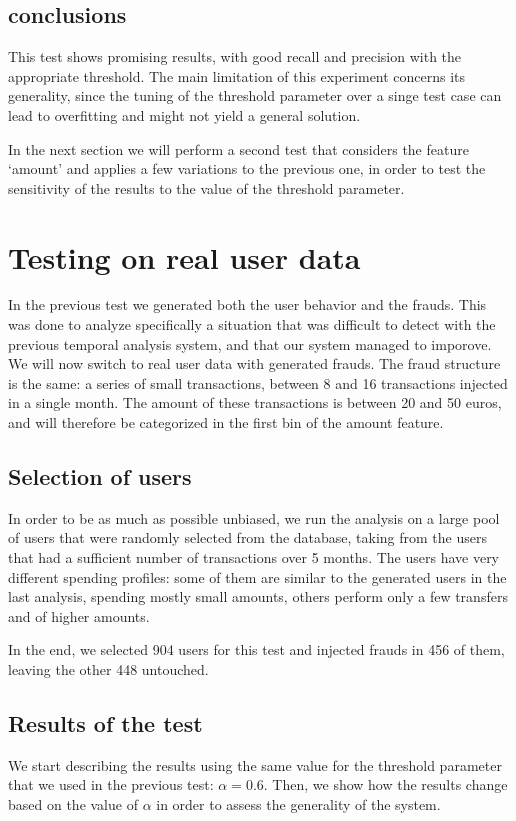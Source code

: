 \subsection{conclusions}

This test shows promising results, with good recall and precision with the appropriate threshold. The main limitation of this experiment concerns its generality, since the tuning of the threshold parameter over a singe test case can lead to overfitting and might not yield a general solution.

In the next section we will perform a second test that considers the feature `amount' and applies a few variations to the previous one, in order to test the sensitivity of the results to the value of the threshold parameter.

\section{Testing on real user data}

In the previous test we generated both the user behavior and the frauds. This was done to analyze specifically a situation that was difficult to detect with the previous temporal analysis system, and that our system managed to imporove. We will now switch to real user data with generated frauds. The fraud structure is the same: a series of small transactions, between 8 and 16 transactions injected in a single month. The amount of these transactions is between 20 and 50 euros, and will therefore be categorized in the first bin of the amount feature.

\subsection{Selection of users}
In order to be as much as possible unbiased, we run the analysis on a large pool of users that were randomly selected from the database, taking from the users that had a sufficient number of transactions over 5 months. The users have very different spending profiles: some of them are similar to the generated users in the last analysis, spending mostly small amounts, others perform only a few transfers and of higher amounts.

In the end, we selected 904 users for this test and injected frauds in 456 of them, leaving the other 448 untouched.

\subsection{Results of the test}
We start describing the results using the same value for the threshold parameter that we used in the previous test: $\alpha = 0.6$. Then, we show how the results change based on the value of $\alpha$ in order to assess the generality of the system.

